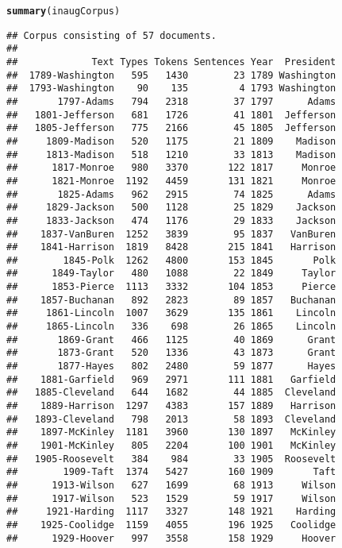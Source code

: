 \documentclass[11pt]{article}\usepackage[]{graphicx}\usepackage[]{color}
\makeatletter
\newcommand{\hlstd}[1]{\textcolor[rgb]{0.345,0.345,0.345}{#1}}%
\newcommand{\hlkwd}[1]{\textcolor[rgb]{0.737,0.353,0.396}{\textbf{#1}}}%
\newenvironment{kframe}{%
 \def\at@end@of@kframe{}%
 \ifinner\ifhmode%
  \def\at@end@of@kframe{\end{minipage}}%
  \begin{minipage}{\columnwidth}%
 \fi\fi%
 \def\FrameCommand##1{\hskip\@totalleftmargin \hskip-\fboxsep
 \colorbox{shadecolor}{##1}\hskip-\fboxsep
     \hskip-\linewidth \hskip-\@totalleftmargin \hskip\columnwidth}%
 \MakeFramed {\advance\hsize-\width
   \@totalleftmargin\z@ \linewidth\hsize
   \@setminipage}}%
 {\par\unskip\endMakeFramed%
 \at@end@of@kframe}
\newenvironment{knitrout}{}{} %
\makeatother
\begin{document}
\begin{knitrout}\footnotesize
{}\color{fgcolor}\begin{kframe}
\begin{alltt}
\hlkwd{summary}\hlstd{(inaugCorpus)}
\end{alltt}
\begin{verbatim}
## Corpus consisting of 57 documents.
## 
##             Text Types Tokens Sentences Year  President
##  1789-Washington   595   1430        23 1789 Washington
##  1793-Washington    90    135         4 1793 Washington
##       1797-Adams   794   2318        37 1797      Adams
##   1801-Jefferson   681   1726        41 1801  Jefferson
##   1805-Jefferson   775   2166        45 1805  Jefferson
##     1809-Madison   520   1175        21 1809    Madison
##     1813-Madison   518   1210        33 1813    Madison
##      1817-Monroe   980   3370       122 1817     Monroe
##      1821-Monroe  1192   4459       131 1821     Monroe
##       1825-Adams   962   2915        74 1825      Adams
##     1829-Jackson   500   1128        25 1829    Jackson
##     1833-Jackson   474   1176        29 1833    Jackson
##    1837-VanBuren  1252   3839        95 1837   VanBuren
##    1841-Harrison  1819   8428       215 1841   Harrison
##        1845-Polk  1262   4800       153 1845       Polk
##      1849-Taylor   480   1088        22 1849     Taylor
##      1853-Pierce  1113   3332       104 1853     Pierce
##    1857-Buchanan   892   2823        89 1857   Buchanan
##     1861-Lincoln  1007   3629       135 1861    Lincoln
##     1865-Lincoln   336    698        26 1865    Lincoln
##       1869-Grant   466   1125        40 1869      Grant
##       1873-Grant   520   1336        43 1873      Grant
##       1877-Hayes   802   2480        59 1877      Hayes
##    1881-Garfield   969   2971       111 1881   Garfield
##   1885-Cleveland   644   1682        44 1885  Cleveland
##    1889-Harrison  1297   4383       157 1889   Harrison
##   1893-Cleveland   798   2013        58 1893  Cleveland
##    1897-McKinley  1181   3960       130 1897   McKinley
##    1901-McKinley   805   2204       100 1901   McKinley
##   1905-Roosevelt   384    984        33 1905  Roosevelt
##        1909-Taft  1374   5427       160 1909       Taft
##      1913-Wilson   627   1699        68 1913     Wilson
##      1917-Wilson   523   1529        59 1917     Wilson
##     1921-Harding  1117   3327       148 1921    Harding
##    1925-Coolidge  1159   4055       196 1925   Coolidge
##      1929-Hoover   997   3558       158 1929     Hoover

\end{verbatim}
\end{kframe}
\end{knitrout}
\end{document}

